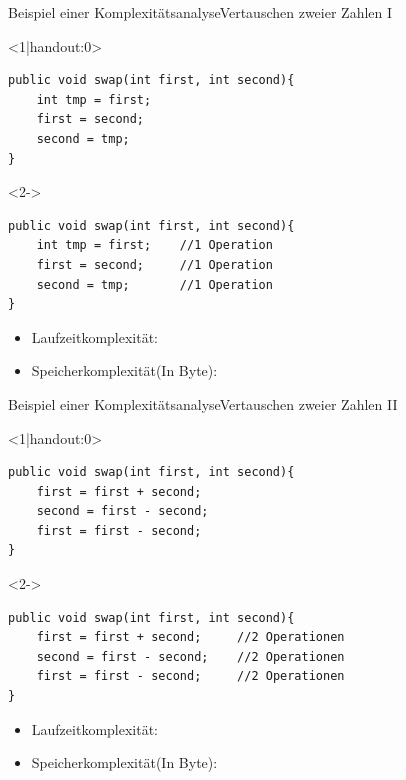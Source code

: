 \begin{frame}[fragile]{Beispiel einer Komplexitätsanalyse}{Vertauschen zweier Zahlen I}
\lstset{style=java}
\begin{onlyenv}<1|handout:0>
\begin{lstlisting}
public void swap(int first, int second){
    int tmp = first;
    first = second;
    second = tmp;
}
\end{lstlisting}
\end{onlyenv}

\begin{onlyenv}<2->
\begin{lstlisting}
public void swap(int first, int second){
    int tmp = first;    //1 Operation
    first = second;     //1 Operation
    second = tmp;       //1 Operation
}
\end{lstlisting}
\end{onlyenv}

\begin{itemize}
    \item Laufzeitkomplexität: 
    \item<4-> Speicherkomplexität(In Byte): 
\end{itemize}
\end{frame}

\begin{frame}[fragile]{Beispiel einer Komplexitätsanalyse}{Vertauschen zweier Zahlen II}
\lstset{style=java}
\begin{onlyenv}<1|handout:0>
\begin{lstlisting}
public void swap(int first, int second){
    first = first + second;
    second = first - second;
    first = first - second;
}
\end{lstlisting}
\end{onlyenv}
\begin{onlyenv}<2->
\begin{lstlisting}
public void swap(int first, int second){
    first = first + second;     //2 Operationen
    second = first - second;    //2 Operationen
    first = first - second;     //2 Operationen
}
\end{lstlisting}
\end{onlyenv}


\begin{itemize}
    \item Laufzeitkomplexität: 
    \item<4-> Speicherkomplexität(In Byte): 
\end{itemize}
\end{frame}

